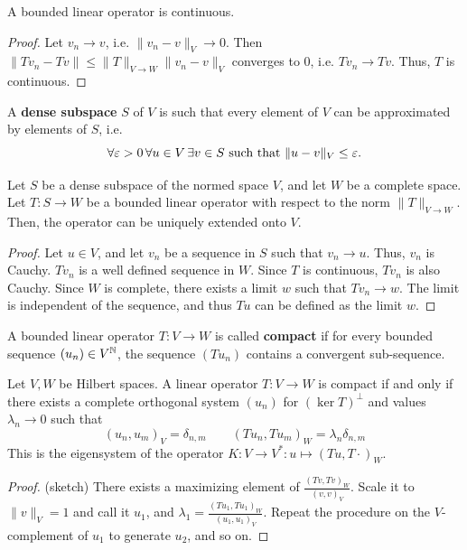\begin{lemma} A bounded linear operator is continuous.
\end{lemma}
\begin{proof} Let $v_n \rightarrow v$, i.e. $\| v_n - v \|_V \rightarrow 0$.  
Then $\| T v_n - T v \| \leq \| T \|_{V \rightarrow W } \| v_n - v \|_V$ converges to 0,
i.e. $T v_n \rightarrow T v$. Thus, $T$ is continuous.
\end{proof}

\begin{definition} A {\bf dense subspace} $S$ of $V$ is such that every element of $V$ 
can be approximated by elements of $S$, i.e.
$$
\forall {\varepsilon> 0} \,  \forall { u \in V }  \, \exists { v \in S }  \mbox{ such that } \| u - v \|_V \leq \varepsilon.
$$
\end{definition}
\begin{lemma}  Let $S$ be a dense subspace of the normed space $V$, 
and let $W$ be a complete space. Let $T : S \rightarrow W$ be a bounded linear operator 
with respect to the norm $\| T \|_{V \rightarrow W}$. Then, the operator can be uniquely extended onto $V$.
\end{lemma}
\begin{proof} Let $u \in V$, and let $v_n$ be a sequence in $S$ such that $v_n \rightarrow u$. 
Thus, $v_n$ is Cauchy. $T v_n$ is a well defined sequence in $W$. Since $T$ is continuous, $T v_n$ is also Cauchy. 
Since $W$ is complete, there exists a limit $w$ such that $T v_n \rightarrow w$. The limit is independent of the sequence, and thus $T u$ can be defined as the limit $w$.
\end{proof}



\begin{definition} A bounded linear operator $T : V \rightarrow W$ is called {\bf compact} if for every bounded sequence $(u_n) \in V^{\mathbb N}$, the sequence $(T u_n)$ contains a convergent sub-sequence.
\end{definition}

\begin{lemma} Let $V, W$ be Hilbert spaces. A linear operator $T : V \rightarrow W$ is
  compact if and only if there exists a complete orthogonal system
  $(u_n)$ for $(\operatorname{ker} T)^\bot$ and values $\lambda_n \rightarrow 0$ such that
$$
(u_n, u_m)_V = \delta_{n,m} \qquad (T u_n, T u_m)_W = \lambda_n \delta_{n,m}
$$
This is the eigensystem of the operator $K : V \rightarrow V^\ast : u \mapsto (T u, T \cdot)_W$.
\end{lemma}
\begin{proof} (sketch) There exists a maximizing element of $\frac{ (Tv, Tv)_W } { (v,v)_V }$.
Scale it to $\| v \|_V = 1 $ and call it $u_1$, and $\lambda_1 = \frac{ (Tu_1, Tu_1)_W } { (u_1,u_1)_V }$. Repeat the procedure on the $V$-complement of $u_1$ to generate $u_2$, and so on. 
\end{proof}


